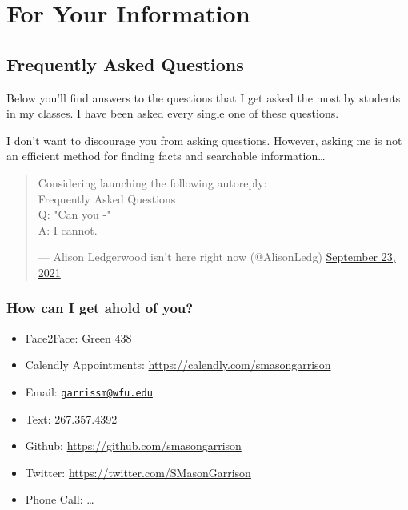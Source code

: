 \documentclass[
]{book}
\begin{document}
\hypertarget{part-for-your-information}{%
\part*{For Your Information}\label{part-for-your-information}}

\hypertarget{frequently-asked-questions}{%
\chapter{Frequently Asked Questions}\label{frequently-asked-questions}}

Below you'll find answers to the questions that I get asked the most by students in my classes. I have been asked every single one of these questions.

I don't want to discourage you from asking questions. However, asking me is not an efficient method for finding facts and searchable information\ldots{}

\begin{quote}
Considering launching the following autoreply:\\
Frequently Asked Questions\\
Q: "Can you -"\\
A: I cannot.

--- Alison Ledgerwood isn't here right now (@AlisonLedg) \href{https://twitter.com/AlisonLedg/status/1441181845706579969}{September
23,
2021}
\end{quote}

\hypertarget{how-can-i-get-ahold-of-you}{%
\section{How can I get ahold of you?}\label{how-can-i-get-ahold-of-you}}

\begin{itemize}
\item
  Face2Face: Green 438
\item
  Calendly Appointments: \url{https://calendly.com/smasongarrison}
\item
  Email: \href{mailto:garrissm@wfu.edu}{\nolinkurl{garrissm@wfu.edu}}
\item
  Text: 267.357.4392
\item
  Github: \url{https://github.com/smasongarrison}
\item
  Twitter: \url{https://twitter.com/SMasonGarrison}
\item
  Phone Call: \ldots{}
\end{itemize}
\end{document}
